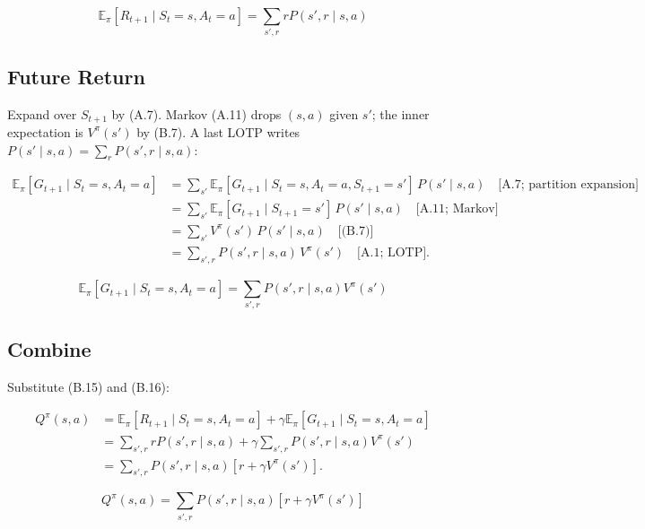\begin{equation}
\boxed{
\mathbb{E}_\pi[R_{t+1}\mid S_t=s,A_t=a]
=
\sum_{s',r}
rP(s',r\mid s,a)
}
\tag{B.15}
\end{equation}

\subsection{Future Return}

Expand over $S_{t+1}$ by (A.7). Markov (A.11) drops $(s,a)$ given $s'$; the inner expectation is $V^\pi(s')$ by (B.7). A last LOTP writes $P(s'\mid s,a)=\sum_r P(s',r\mid s,a)$:

\[
\begin{aligned}
\mathbb{E}_\pi[G_{t+1}\mid S_t=s,A_t=a]
&=
\sum_{s'}
\mathbb{E}_\pi[G_{t+1}\mid S_t=s,A_t=a,S_{t+1}=s']
\,
P(s'\mid s,a)
\quad\text{[A.7; partition expansion]}
\\
&=
\sum_{s'}
\mathbb{E}_\pi[G_{t+1}\mid S_{t+1}=s']
\,
P(s'\mid s,a)
\quad\text{[A.11; Markov]}
\\
&=
\sum_{s'}
V^\pi(s')\, P(s'\mid s,a)
\quad\text{[(B.7)]}
\\
&=
\sum_{s',r}
P(s',r\mid s,a)\, V^\pi(s')
\quad\text{[A.1; LOTP]}.
\end{aligned}
\]

\begin{equation}
\boxed{
\mathbb{E}_\pi[G_{t+1}\mid S_t=s,A_t=a]
=
\sum_{s',r}
P(s',r\mid s,a)V^\pi(s')
}
\tag{B.16}
\end{equation}

\subsection{Combine}

Substitute (B.15) and (B.16):

\[
\begin{aligned}
Q^\pi(s,a)
&=
\mathbb{E}_\pi[R_{t+1}\mid S_t=s,A_t=a]
+
\gamma
\mathbb{E}_\pi[G_{t+1}\mid S_t=s,A_t=a] \\
&=
\sum_{s',r}
rP(s',r\mid s,a)
+
\gamma
\sum_{s',r}
P(s',r\mid s,a)V^\pi(s') \\
&=
\sum_{s',r}
P(s',r\mid s,a)
\left[
r+\gamma V^\pi(s')
\right].
\end{aligned}
\]

\begin{equation}
\boxed{
Q^\pi(s,a)
=
\sum_{s',r}
P(s',r\mid s,a)
\left[
r+\gamma V^\pi(s')
\right]
}
\tag{B.17}\label{eq:B.17}
\end{equation}

